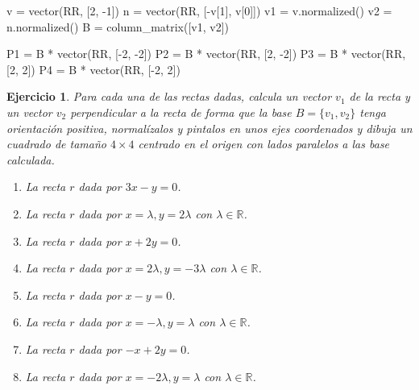 \documentclass{amsart}
\newtheorem{ejer}{Ejercicio}
\begin{document}
\begin{sageblock}
v = vector(RR, [2, -1])
n = vector(RR, [-v[1], v[0]])
v1 = v.normalized()
v2 = n.normalized()
B = column_matrix([v1, v2])

P1 = B * vector(RR, [-2, -2])
P2 = B * vector(RR, [2, -2])
P3 = B * vector(RR, [2, 2])
P4 = B * vector(RR, [-2, 2])
\end{sageblock}

\begin{sagesub}
\begin{center}
\end{center}
\end{sagesub}

\begin{ejer}
Para cada una de las rectas dadas, calcula un vector $v_1$ de la recta y un vector $v_2$ perpendicular
a la recta de forma que la base $B = \{v_1,v_2\}$ tenga orientación positiva, normalízalos y pintalos 
en unos ejes coordenados y dibuja un cuadrado de tamaño $4\times 4$ centrado en el origen con lados 
paralelos a las base calculada.

\begin{enumerate}
\item La recta $r$ dada por $3x-y = 0$.
\item La recta $r$ dada por $x = \lambda, y = 2\lambda$ con $\lambda \in {\mathbb R}$.
\item La recta $r$ dada por $x+2y = 0$.
\item La recta $r$ dada por $x = 2\lambda, y = -3\lambda$ con $\lambda \in {\mathbb R}$.
\item La recta $r$ dada por $x-y = 0$.
\item La recta $r$ dada por $x = -\lambda, y = \lambda$ con $\lambda \in {\mathbb R}$.
\item La recta $r$ dada por $-x+2y = 0$.
\item La recta $r$ dada por $x = -2\lambda, y = \lambda$ con $\lambda \in {\mathbb R}$.
\end{enumerate}
\end{ejer}
\end{document}
